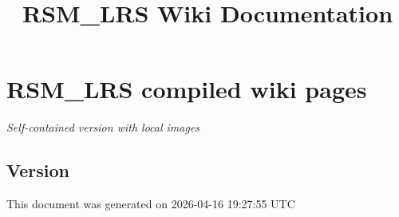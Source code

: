 \documentclass[
  11pt,
]{article}
\title{RSM\_LRS Wiki Documentation}
\author{}
\date{}
\begin{document}
\maketitle

{
\hypersetup{linkcolor=}
\setcounter{tocdepth}{3}
\tableofcontents
}
\hypertarget{rsm_lrs-compiled-wiki-pages}{%
\section{RSM\_LRS compiled wiki
pages}\label{rsm_lrs-compiled-wiki-pages}}

\emph{Self-contained version with local images}

\hypertarget{version}{%
\subsection{Version}\label{version}}

This document was generated on 2026-04-16 19:27:55 UTC
\end{document}
